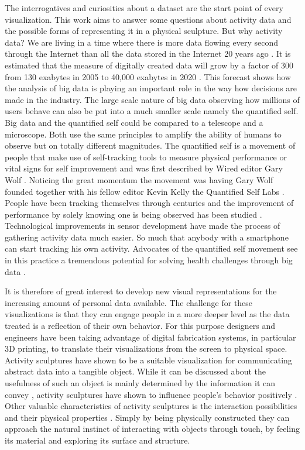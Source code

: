 \documentclass[../medieninformatik-arbeit.tex]{subfiles}
\begin{document}
The interrogatives and curiosities about a dataset are the start point of
every visualization. This work aims to answer some questions about activity data and the
possible forms of representing it in a physical sculpture. But why activity
data? We are living in a time where there is more data flowing every second through the
Internet than all the data stored in the Internet 20 years
ago \cite{mayer2013big}. It is estimated that the measure of digitally created data
will grow by a factor of 300 from 130 exabytes in 2005 to 40,000 exabytes in
2020 \cite{gantz2012digital}. This forecast shows how the analysis of big data is 
playing an important role in the way how decisions are made in the industry. The
large scale nature of big data observing how millions of users behave can also
be put into a much smaller scale namely the quantified self. Big data and the
quantified self could be compared to a telescope and a microscope. Both use the
same principles to amplify the ability of humans to observe but on totally
different magnitudes. The quantified self is a movement of people that make use of
self-tracking tools to measure physical performance or vital signs for self
improvement and was first described by Wired editor Gary
Wolf \cite{wolf2009know}. Noticing the great momentum the movement was having
Gary Wolf founded together with his fellow editor Kevin Kelly the Quantified
Self Labs \cite{quantified:2015:Online}. People have been
tracking themselves through centuries and the improvement of performance by
solely knowing one is being observed has been studied \cite{mccarney2007hawthorne}. Technological improvements in
sensor development have made the process of gathering activity data much easier.
So much that anybody with a smartphone can start tracking his own activity.
Advocates of the quantified self movement see in this practice a tremendous
potential for solving health challenges through big
data \cite{swan2013quantified}. 

It is therefore  of great interest to develop new
visual representations for the increasing amount of personal data available. The
challenge for these visualizations is that they can engage people in a more
deeper level as the data treated is a reflection of their own behavior. For this
purpose designers and engineers have been taking advantage of digital
fabrication systems, in particular 3D printing, to translate their
visualizations from the screen to physical space. Activity sculptures have shown
to be a suitable visualization for communicating abstract data into a tangible
object. While it can be discussed about the usefulness of such an object is
mainly determined by the information it can convey \cite{zhao2008embodiment}, 
activity sculptures have shown to influence people's behavior
positively \cite{khot2014understanding}. Other valuable characteristics of activity
sculptures is the interaction possibilities and their physical 
properties \cite{zhao2008embodiment}. Simply by being physically constructed they
can approach the natural instinct of interacting with objects through touch, 
by feeling its material and exploring its surface and structure.
\end{document}
